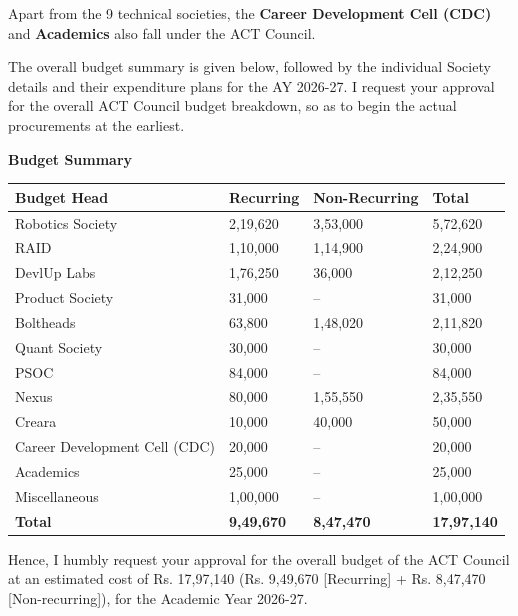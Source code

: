 \documentclass[11pt,letterpaper]{article}
\newcommand{\rs}{{\rupee}}
\newcommand{\society}[1]{\par\bigskip{\sffamily\bfseries\large #1}\par}
\newcommand{\subhead}[1]{\par{\bfseries #1}\par}
\begin{document}
Apart from the 9 technical societies, the {\bfseries Career Development Cell (CDC)} and {\bfseries Academics} also fall under the ACT Council.

The overall budget summary is given below, followed by the individual Society details and their expenditure plans for the AY 2026-27. I request your approval for the overall ACT Council budget breakdown, so as to begin the actual procurements at the earliest.

\clearpage
\subhead{Budget Summary}
\begin{longtable}{|L{0.34\textwidth}|R{0.18\textwidth}|R{0.18\textwidth}|R{0.18\textwidth}|}
\hline
\textbf{Budget Head} & \textbf{Recurring} & \textbf{Non-Recurring} & \textbf{Total}\\ \hline
Robotics Society & \rs2,19,620 & \rs3,53,000 & \rs5,72,620\\ \hline
RAID & \rs1,10,000 & \rs1,14,900 & \rs2,24,900\\ \hline
DevlUp Labs & \rs1,76,250 & \rs36,000 & \rs2,12,250\\ \hline
Product Society & \rs31,000 & -- & \rs31,000\\ \hline
Boltheads & \rs63,800 & \rs1,48,020 & \rs2,11,820\\ \hline
Quant Society & \rs30,000 & -- & \rs30,000\\ \hline
PSOC & \rs84,000 & -- & \rs84,000\\ \hline
Nexus & \rs80,000 & \rs1,55,550 & \rs2,35,550\\ \hline
Creara & \rs10,000 & \rs40,000 & \rs50,000\\ \hline
Career Development Cell (CDC) & \rs20,000 & -- & \rs20,000\\ \hline
Academics & \rs25,000 & -- & \rs25,000\\ \hline
Miscellaneous & \rs1,00,000 & -- & \rs1,00,000\\ \hline
\textbf{Total} & \textbf{\rs9,49,670} & \textbf{\rs8,47,470} & \textbf{\rs17,97,140}\\ \hline
\end{longtable}

Hence, I humbly request your approval for the overall budget of the ACT Council at an estimated cost of Rs. 17,97,140 (Rs. 9,49,670 [Recurring] + Rs. 8,47,470 [Non-recurring]), for the Academic Year 2026-27.

\clearpage
\society{1.\ \ Robotics Society}
\end{document}

